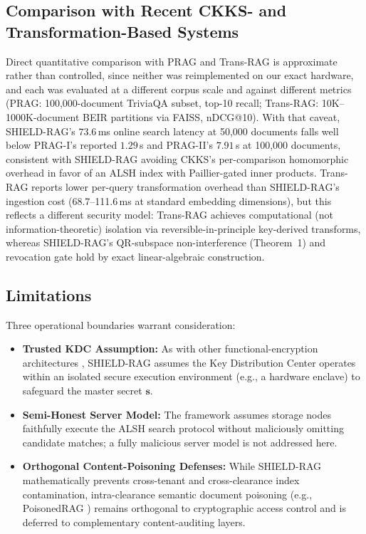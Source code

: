 \documentclass[10pt,a4paper]{article}
\begin{document}
\subsection{Comparison with Recent CKKS- and Transformation-Based Systems}
Direct quantitative comparison with PRAG \cite{li2026prag} and Trans-RAG \cite{liu2026transrag} is approximate rather than controlled, since neither was reimplemented on our exact hardware, and each was evaluated at a different corpus scale and against different metrics (PRAG: 100,000-document TriviaQA subset, top-10 recall; Trans-RAG: 10K--1000K-document BEIR partitions via FAISS, nDCG@10). With that caveat, SHIELD-RAG's $73.6$\,ms online search latency at 50,000 documents falls well below PRAG-I's reported $1.29$\,s and PRAG-II's $7.91$\,s at 100,000 documents, consistent with SHIELD-RAG avoiding CKKS's per-comparison homomorphic overhead in favor of an ALSH index with Paillier-gated inner products. Trans-RAG reports lower per-query transformation overhead than SHIELD-RAG's ingestion cost (68.7--111.6\,ms at standard embedding dimensions), but this reflects a different security model: Trans-RAG achieves computational (not information-theoretic) isolation via reversible-in-principle key-derived transforms, whereas SHIELD-RAG's QR-subspace non-interference (Theorem~1) and revocation gate hold by exact linear-algebraic construction.

\subsection{Limitations}
Three operational boundaries warrant consideration:
\begin{itemize}
    \item \textbf{Trusted KDC Assumption:} As with other functional-encryption architectures \cite{yang2024cpipfe, zhou2026cipherag}, SHIELD-RAG assumes the Key Distribution Center operates within an isolated secure execution environment (e.g., a hardware enclave) to safeguard the master secret $\mathbf{s}$.
    \item \textbf{Semi-Honest Server Model:} The framework assumes storage nodes faithfully execute the ALSH search protocol without maliciously omitting candidate matches; a fully malicious server model is not addressed here.
    \item \textbf{Orthogonal Content-Poisoning Defenses:} While SHIELD-RAG mathematically prevents cross-tenant and cross-clearance index contamination, intra-clearance semantic document poisoning (e.g., PoisonedRAG \cite{zou2025poisonedrag}) remains orthogonal to cryptographic access control and is deferred to complementary content-auditing layers.
\end{itemize}
\end{document}
